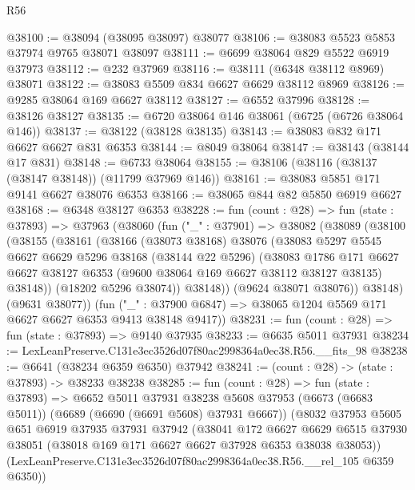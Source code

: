 \begin{lexlean}{R56}
\begin{coremodule}
@38100 := @38094 (@38095 @38097) @38077
@38106 := @38083 @5523 @5853 @37974 @9765 @38071 @38097
@38111 := @6699 @38064 @829 @5522 @6919 @37973
@38112 := @232 @37969
@38116 := @38111 (@6348 @38112 @8969) @38071
@38122 := @38083 @5509 @834 @6627 @6629 @38112 @8969
@38126 := @9285 @38064 @169 @6627 @38112
@38127 := @6552 @37996
@38128 := @38126 @38127
@38135 := @6720 @38064 @146 @38061 (@6725 (@6726 @38064 @146))
@38137 := @38122 (@38128 @38135)
@38143 := @38083 @832 @171 @6627 @6627 @831 @6353
@38144 := @8049 @38064
@38147 := @38143 (@38144 @17 @831)
@38148 := @6733 @38064
@38155 := @38106 (@38116 (@38137 (@38147 @38148)) (@11799 @37969 @146))
@38161 := @38083 @5851 @171 @9141 @6627 @38076 @6353
@38166 := @38065 @844 @82 @5850 @6919 @6627
@38168 := @6348 @38127 @6353
@38228 := fun (count : @28) =>
  fun (state : @37893) =>
  @37963
    (@38060
      (fun ("_" : @37901) =>
      @38082
        (@38089
          (@38100
            (@38155
              (@38161
                (@38166
                  (@38073 @38168)
                  @38076
                  (@38083
                    @5297
                    @5545
                    @6627
                    @6629
                    @5296
                    @38168
                    (@38144 @22 @5296)
                    (@38083
                      @1786
                      @171
                      @6627
                      @6627
                      @38127
                      @6353
                      (@9600 @38064 @169 @6627 @38112 @38127 @38135)
                      @38148))
                  (@18202 @5296 @38074))
                @38148))
            (@9624 @38071 @38076))
          @38148)
        (@9631 @38077))
      (fun ("_" : @37900 @6847) => @38065 @1204 @5569 @171 @6627 @6627 @6353 @9413 @38148 @9417))
@38231 := fun (count : @28) => fun (state : @37893) => @9140 @37935
@38233 := @6635 @5011 @37931
@38234 := LexLeanPreserve.C131e3ec3526d07f80ac2998364a0ec38.R56.__fits_98
@38238 := @6641 (@38234 @6359 @6350) @37942
@38241 := (count : @28) -> (state : @37893) -> @38233 @38238
@38285 := fun (count : @28) =>
  fun (state : @37893) =>
  @6652
    @5011
    @37931
    @38238
    @5608
    @37953
    (@6673 (@6683 @5011))
    (@6689 (@6690 (@6691 @5608) @37931 @6667))
    (@8032
      @37953
      @5605
      @651
      @6919
      @37935
      @37931
      @37942
      (@38041
        @172
        @6627
        @6629
        @6515
        @37930
        @38051
        (@38018 @169 @171 @6627 @6627 @37928 @6353 @38038 @38053))
      (LexLeanPreserve.C131e3ec3526d07f80ac2998364a0ec38.R56.__rel_105 @6359 @6350))

\end{coremodule}
\end{lexlean}
